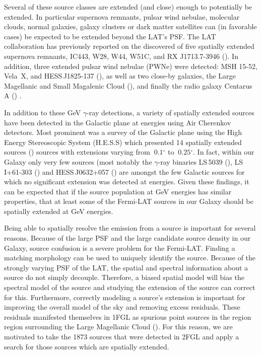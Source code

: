 \documentclass[12pt,preprint]{aastex}
\newcommand{\gev}{\text{GeV}\xspace}
\newcommand{\tev}{\text{TeV}\xspace}
\renewcommand{\deg}{\ensuremath{^\circ}\xspace}
\begin{document}
Several of these source classes are extended (and close) enough to
potentially be extended. In particular supernova remnants, pulsar wind
nebulae, molecular clouds, normal galaxies, galaxy clusters or dark
matter satellites can (in favorable cases) be expected to be extended
beyond the LAT's PSF. The LAT collaboration has previously reported on
the discovered of five spatially extended supernova remnants, IC443,
W28, W44, W51C, and RX J1713.7-3946
(\cite{ic443,w28,w44,w51c,rx_j1713_lat}). In addition, three extended
pulsar wind nebulae (PWNe) were detected: MSH 15-52, Vela~X, and
HESS\,J1825-137 (\cite{msh1552,velax,fermi_hess_j1825}), as well as
two close-by galaxies, the Large Magellanic and Small Magalenic Cloud
(\cite{lmc,smc}), and finally the radio galaxy Centarus A
(\cite{cen_a_lat}) .

In addition to these GeV $\gamma$-ray detections, a variety of
spatially extended sources have been detected in the Galactic plane at
\tev energies using Air Cherenkov detectors. Most prominent was a
survey of the Galactic plane using the High Energy Stereoscopic System
(H.E.S.S) which presented 14 spatially extended sources
(\cite{hess_plane_survey}) sources with extensions varying from
$~0.1\deg$ to $~0.25\deg$. In fact, within our Galaxy only very few
sources (most notably the $\gamma$-ray binaries
LS\,5039 (\cite{HESSLS5039}), LS I+61-303 (\cite{MAGICLSI, VERITASLSI}) and
HESS\,J0632+057 (\cite{HESS0632}) are amongst the few Galactic sources
for which no significant extension was detected at \tev
energies. Given these findings, it can be expected that if the source
population at GeV energies has similar properties, that at least some
of the Fermi-LAT sources in our Galaxy should be spatially extended at
GeV energies.

Being able to spatially resolve the \gev emission from a source is
important for several reasons. Because of the large PSF and the large
candidate source density in our Galaxy, source confusion is a severe
problem for the Fermi-LAT. Finding a matching morphology can be used
to uniquely identify the source.  Because of the strongly varying PSF
of the LAT, the spatial and spectral information about a source do not
simply decouple. Therefore, a biased spatial model will bias the
spectral model of the source and studying the extension of the source
can correct for this.  Furthermore, correctly modeling a source's
extension is important for improving the overall model of the sky and
removing excess residuals.  These residuals manifested themselves in
1FGL as spurious point sources in the region region surrounding the
Large Magellanic Cloud (\cite{first_cat}).  For this reason, we are
motivated to take the 1873 sources that were detected in 2FGL and
apply a search for those sources which are spatially extended.
\end{document}
